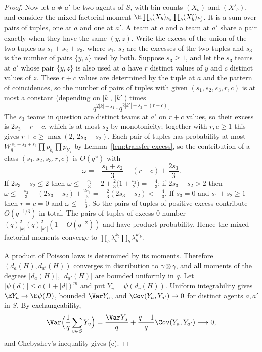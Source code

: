 \begin{proof}
Now let $a\ne a'$ be two agents of $S$, with bin counts $(X_b)$ and $(X'_b)$, and consider the
mixed factorial moment $\E\prod_b(X_b)_{k_b}\prod_b(X'_b)_{k'_b}$. It is a sum over pairs of
tuples, one at $a$ and one at $a'$. A team at $a$ and a team at $a'$ share a pair exactly when
they have the same $(y,z)$. Write the excess of the union of the two tuples as $s_1+s_2+s_3$,
where $s_1$, $s_2$ are the excesses of the two tuples and $s_3$ is the number of pairs
$\{y,z\}$ used by both. Suppose $s_3\ge1$, and let the $s_3$ teams at $a'$ whose pair
$\{y,z\}$ is also used at $a$ have $r$ distinct values of $y$ and $c$ distinct values of $z$.
These $r+c$ values are determined by the tuple at $a$ and the pattern of coincidences, so the
number of pairs of tuples with given $(s_1,s_2,s_3,r,c)$ is at most a constant (depending on
$|k|$, $|k'|$) times
\[
q^{2|k|-s_1}\cdot q^{2|k'|-s_2-(r+c)} .
\]
The $s_3$ teams in question are distinct teams at $a'$ on $r+c$ values, so their excess is
$2s_3-r-c$, which is at most $s_2$ by monotonicity; together with $r,c\ge1$ this gives
$r+c\ge\max(2,\,2s_3-s_2)$. Each pair of tuples has probability at most
$W_q^{\,s_1+s_2+s_3}\prod p_{b_i}\prod p_{b'_i}$ by Lemma~\ref{lem:transfer-excess}, so the
contribution of a class $(s_1,s_2,s_3,r,c)$ is $O(q^{\omega})$ with
\[
\omega=-\frac{s_1+s_2}{3}-(r+c)+\frac{2s_3}{3}.
\]
If $2s_3-s_2\le2$ then
$\omega\le-\frac{s_2}{3}-2+\frac23\bigl(1+\frac{s_2}{2}\bigr)=-\frac43$; if $2s_3-s_2>2$ then
$\omega\le-\frac{s_2}{3}-(2s_3-s_2)+\frac{2s_3}{3}=-\frac23(2s_3-s_2)<-\frac43$. If $s_3=0$ and
$s_1+s_2\ge1$ then $r=c=0$ and $\omega\le-\frac13$. So the pairs of tuples of
positive excess contribute $O(q^{-1/3})$ in total. The pairs of tuples of excess $0$ number
$(q)_{|k|}^2(q)_{|k'|}^2(1-O(q^{-2}))$ and have product probability. Hence the mixed factorial
moments converge to $\prod_b\lambda_b^{k_b}\prod_b\lambda_b^{k'_b}$.

A product of Poisson laws is determined by its moments. Therefore
$(d_a(H),d_{a'}(H))$ converges in distribution to $\gamma\otimes\gamma$, and all moments of the
degrees $|d_a(H)|$, $|d_{a'}(H)|$ are bounded uniformly in $q$. Let
$|\psi(d)|\le c(1+|d|)^m$ and put $Y_v=\psi(d_v(H))$. Uniform integrability gives
$\E Y_a\to\E\psi(D)$, bounded $\Var Y_a$, and $\Cov(Y_a,Y_{a'})\to0$ for distinct
agents $a,a'$ in $S$. By exchangeability,
\[
\Var\Bigl(\frac1q\sum_{v\in S}Y_v\Bigr)
=\frac{\Var Y_a}{q}+\frac{q-1}{q}\Cov(Y_a,Y_{a'})\longrightarrow0,
\]
and Chebyshev's inequality gives (c).
\end{proof}

